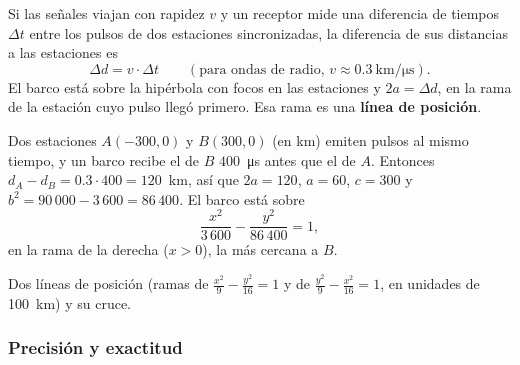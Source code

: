 \documentclass[11pt]{article}
\begin{document}
\begin{teorema}
Si las señales viajan con rapidez $v$ y un receptor mide una diferencia de tiempos
$\Delta t$ entre los pulsos de dos estaciones sincronizadas, la diferencia de sus
distancias a las estaciones es
\[ \Delta d = v \cdot \Delta t \qquad (\text{para ondas de radio, } v \approx \num{0,3}~\text{km}/\unit{\micro\second}). \]
El barco está sobre la hipérbola con focos en las estaciones y $2a = \Delta d$, en la
rama de la estación cuyo pulso llegó primero. Esa rama es una \textbf{línea de posición}.
\end{teorema}

\begin{ejemplo}
Dos estaciones $A(-300, 0)$ y $B(300, 0)$ (en km) emiten pulsos al mismo tiempo, y un
barco recibe el de $B$ $400$~\unit{\micro\second} antes que el de $A$. Entonces
$d_A - d_B = \num{0,3} \cdot 400 = 120$~km, así que $2a = 120$, $a = 60$, $c = 300$ y
$b^2 = 90\,000 - 3\,600 = 86\,400$. El barco está sobre
\[ \frac{x^2}{3\,600} - \frac{y^2}{86\,400} = 1, \]
en la rama de la derecha ($x > 0$), la más cercana a $B$.
\end{ejemplo}

\begin{center}

{\small Dos líneas de posición (ramas de $\frac{x^2}{9} - \frac{y^2}{16} = 1$ y de
$\frac{y^2}{9} - \frac{x^2}{16} = 1$, en unidades de 100~km) y su cruce.}
\end{center}

\subsubsection*{Precisión y exactitud}
\end{document}

